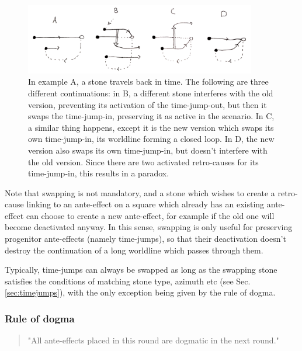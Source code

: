 \documentclass[12pt]{article}
\begin{document}
	\begin{figure}[h]
\begin{center}
    \includegraphics[width=0.9\textwidth]{images/diag_swapping}
 \caption{In example A, a stone travels back in time. The following are three different continuations: in B, a different stone interferes with the old version, preventing its activation of the time-jump-out, but then it swaps the time-jump-in, preserving it as active in the scenario. In C, a similar thing happens, except it is the new version which swaps its own time-jump-in, its worldline forming a closed loop. In D, the new version also swaps its own time-jump-in, but doesn't interfere with the old version. Since there are two activated retro-causes for its time-jump-in, this results in a paradox.}\label{fig:swapping}
\end{center}
\end{figure}

Note that swapping is not mandatory, and a stone which wishes to create a retro-cause linking to an ante-effect on a square which already has an existing ante-effect can choose to create a new ante-effect, for example if the old one will become deactivated anyway. In this sense, swapping is only useful for preserving progenitor ante-effects (namely time-jumps), so that their deactivation doesn't destroy the continuation of a long worldline which passes through them.

	Typically, time-jumps can always be swapped as long as the swapping stone satisfies the conditions of matching stone type, azimuth etc (see Sec. \ref{sec:timejumps}), with the only exception being given by the rule of dogma.
	
	\subsubsection{Rule of dogma}\label{sec:rule of dogma}
	\begin{quote}
	"All ante-effects placed in this round are dogmatic in the next round."
	\end{quote}
	
\end{document}
